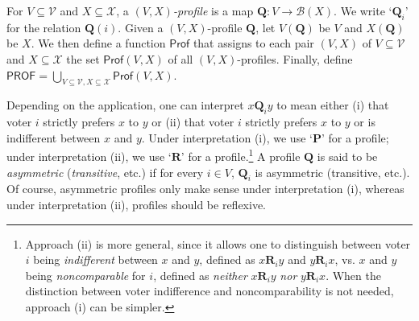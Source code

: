 \documentclass[runningheads]{llncs}
\begin{document}
\begin{definition}\label{ProfileDef} \textnormal{For $V\subseteq\mathcal{V}$ and $X\subseteq\mathcal{X}$, a \emph{$(V,X)$-profile} is a map $\mathbf{Q}:V\to \mathcal{B}(X)$. We write `$\mathbf{Q}_i$' for the relation $\mathbf{Q}(i)$. Given a $(V,X)$-profile $\mathbf{Q}$, let $V(\mathbf{Q})$ be $V$ and $X(\mathbf{Q})$  be $X$. We then define a function $\mathsf{Prof}$ that assigns to each pair $(V,X)$ of $V\subseteq\mathcal{V}$ and $X\subseteq\mathcal{X}$ the set $\mathsf{Prof}(V,X)$ of all $(V,X)$-profiles. Finally, define $\mathsf{PROF} = \bigcup_{V\subseteq\mathcal{V},X\subseteq\mathcal{X}}\mathsf{Prof}(V,X)$.}\end{definition}







Depending on the application, one can interpret $x\mathbf{Q}_i y$ to mean either (i) that voter $i$ strictly prefers $x$ to $y$ or (ii) that voter $i$ strictly prefers $x$ to $y$ or is indifferent between $x$ and $y$. Under interpretation (i), we use `$\mathbf{P}$' for a profile; under interpretation (ii), we use `$\mathbf{R}$' for a profile.\footnote{\label{VoterNote}Approach (ii) is more general, since it allows one to distinguish between voter $i$ being \textit{indifferent} between $x$ and $y$, defined as $x\mathbf{R}_iy$ and $y\mathbf{R}_ix$, vs. $x$ and $y$ being \textit{noncomparable} for $i$, defined as \textit{neither} $x\mathbf{R}_iy$ \textit{nor} $y\mathbf{R}_ix$. When the distinction between voter indifference and noncomparability is not needed, approach (i) can be simpler.} A profile $\mathbf{Q}$ is said to be \emph{asymmetric} (\emph{transitive}, etc.) if for every $i\in V$, $\mathbf{Q}_i$ is asymmetric (transitive, etc.). Of course, asymmetric profiles only make sense under interpretation (i), whereas under interpretation (ii), profiles should be reflexive.
\end{document}
